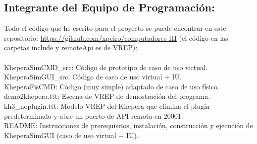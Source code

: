 \documentclass{article}
\begin{document}
\subsection{Integrante del Equipo de Programación:}
Todo el código que he escrito para el proyecto se puede encontrar en este
repositorio: \url{https://github.com/xpeiro/computadores-III}  (el
código en las carpetas include y remoteApi es de VREP):\\ \\
KheperaSimCMD\_src: Código de prototipo de caso de uso virtual. \\
KheperaSimGUI\_src: Código de caso de uso virtual + IU. \\
KheperaFisCMD: Código (muy simple) adaptado de caso de uso físico. \\
demo2khepera.ttt: Escena de VREP de demostración del programa. \\
kh3\_noplugin.ttt: Modelo VREP del Khepera que elimina el plugin predeterminado
y abre un puerto de API remota en 20001. \\
README: Instrucciones de prerequisitos, instalación, construcción y ejecución
de KheperaSimGUI (caso de uso virtual + IU).
	
\end{document}

